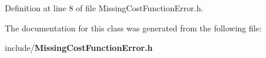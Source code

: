 Definition at line 8 of file Missing\+Cost\+Function\+Error.\+h.



The documentation for this class was generated from the following file\+:\begin{DoxyCompactItemize}
\item 
include/{\bf Missing\+Cost\+Function\+Error.\+h}\end{DoxyCompactItemize}
